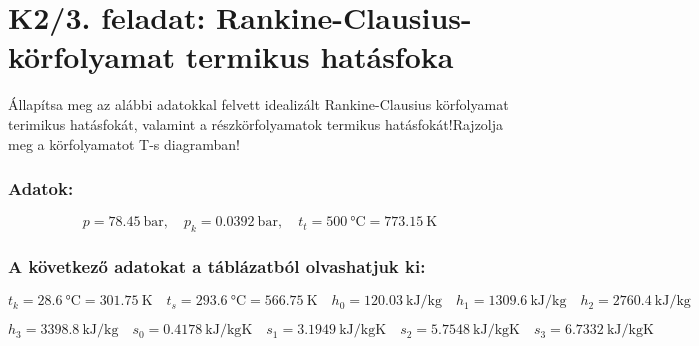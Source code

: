 \section*{K2/3. feladat: Rankine-Clausius-körfolyamat termikus hatásfoka}
Állapítsa meg az alábbi adatokkal felvett idealizált Rankine-Clausius körfolyamat terimikus hatásfokát, valamint a részkörfolyamatok termikus hatásfokát!Rajzolja meg a körfolyamatot T-s diagramban!
\subsubsection{Adatok:}
\begin{equation*}
      p=\SI{78.45}{\bar},
      \quad                            
      p_k=\SI{0.0392}{\bar},
      \quad
      t_t=\SI{500}{\celsius}=\SI{773.15}{\kelvin}
\end{equation*}
\subsubsection{A következő adatokat a táblázatból olvashatjuk ki:}
\begin{equation*}
	t_k=\SI{28.6}{\celsius}=\SI{301.75}{\kelvin}
	\quad 
	t_s=\SI{293.6}{\celsius}=\SI{566.75}{\kelvin}
	\quad
	h_0=\SI{120.03}{\kilo\joule\per\kilogram}
	\quad
	h_1=\SI{1309.6}{\kilo\joule\per\kilogram}
	\quad
	h_2=\SI{2760.4}{\kilo\joule\per\kilogram}
	\quad
\end{equation*}

\begin{equation*}
	h_3=\SI{3398.8}{\kilo\joule\per\kilogram}
	\quad
	s_0=\SI{0.4178}{\kilo\joule\per\kilogram\kelvin}
	\quad
	s_1=\SI{3.1949}{\kilo\joule\per\kilogram\kelvin}
	\quad
	s_2=\SI{5.7548}{\kilo\joule\per\kilogram\kelvin}
	\quad
	s_3=\SI{6.7332}{\kilo\joule\per\kilogram\kelvin}
\end{equation*}

